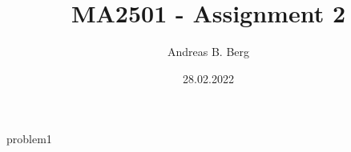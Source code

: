 \documentclass{article}
\begin{document}
\mainmatter

\title{MA2501 - Assignment 2}
\author{Andreas B. Berg}
\date{28.02.2022}
\maketitle
\thispagestyle{fancy}

{problem1}






\end{document}
